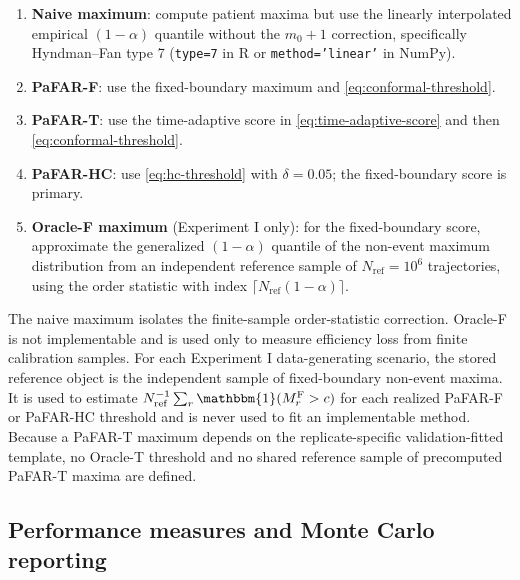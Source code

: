 \documentclass[11pt]{article}
\newcommand{\Ind}{\mathbbm{1}}
\begin{document}
\begin{enumerate}
    \item \textbf{Naive maximum}: compute patient maxima but use the linearly interpolated empirical $(1-\alpha)$ quantile without the $m_0+1$ correction, specifically Hyndman--Fan type 7 (\texttt{type=7} in R or \texttt{method='linear'} in NumPy).
    \item \textbf{PaFAR-F}: use the fixed-boundary maximum and \eqref{eq:conformal-threshold}.
    \item \textbf{PaFAR-T}: use the time-adaptive score in \eqref{eq:time-adaptive-score} and then \eqref{eq:conformal-threshold}.
    \item \textbf{PaFAR-HC}: use \eqref{eq:hc-threshold} with $\delta=0.05$; the fixed-boundary score is primary.
    \item \textbf{Oracle-F maximum} (Experiment I only): for the fixed-boundary score, approximate the generalized $(1-\alpha)$ quantile of the non-event maximum distribution from an independent reference sample of $N_{\mathrm{ref}}=10^6$ trajectories, using the order statistic with index $\lceil N_{\mathrm{ref}}(1-\alpha)\rceil$.
\end{enumerate}
The naive maximum isolates the finite-sample order-statistic correction. Oracle-F is not implementable and is used only to measure efficiency loss from finite calibration samples. For each Experiment I data-generating scenario, the stored reference object is the independent sample of fixed-boundary non-event maxima. It is used to estimate $N_{\mathrm{ref}}^{-1}\sum_r\Ind(M_r^{\mathrm{F}}>c)$ for each realized PaFAR-F or PaFAR-HC threshold and is never used to fit an implementable method. Because a PaFAR-T maximum depends on the replicate-specific validation-fitted template, no Oracle-T threshold and no shared reference sample of precomputed PaFAR-T maxima are defined.

\subsection{Performance measures and Monte Carlo reporting}\label{subsec:sim-metrics}
\end{document}
